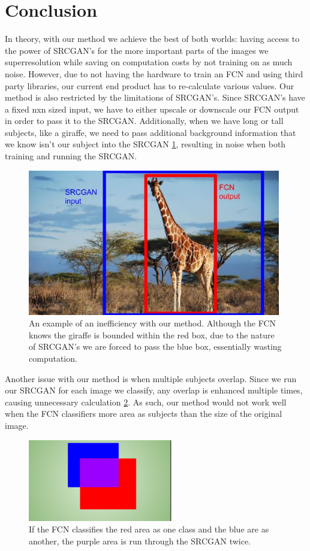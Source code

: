 \section{Conclusion}

In theory, with our method we achieve the best of both worlds: having access to the power of SRCGAN’s for the more important parts of the images we superresolution while saving on computation costs by not training on as much noise. However, due to not having the hardware to train an FCN and using third party libraries, our current end product has to re-calculate various values.
Our method is also restricted by the limitations of SRCGAN’s. Since SRCGAN’s have a fixed nxn sized input, we have to either upscale or downscale our FCN output in order to pass it to the SRCGAN. Additionally, when we have long or tall subjects, like a giraffe, we need to pass additional background information that we know isn’t our subject into the SRCGAN \ref{fig:giraffe}, resulting in noise when both training and running the SRCGAN.
\begin{figure}
    \centering
    \includegraphics[width=\textwidth]{images/giraffe.png}
    \caption{An example of an inefficiency with our method. Although the FCN knows the giraffe is bounded within the red box, due to the nature of SRCGAN's we are forced to pass the blue box, essentially wasting computation.}
    \label{fig:giraffe}
\end{figure}

Another issue with our method is when multiple subjects overlap. Since we run our SRCGAN for each image we classify, any overlap is enhanced multiple times, causing unnecessary calculation \ref{fig:crossover}. As such, our method would not work well when the FCN classifiers more area as subjects than the size of the original image.

\begin{figure}
    \centering
    \includegraphics{images/crossover.png}
    \caption{If the FCN classifies the red area as one class and the blue are as another, the purple area is run through the SRCGAN twice.}
    \label{fig:crossover}
\end{figure}

